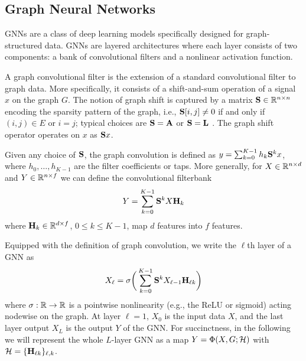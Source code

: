 \subsection{Graph Neural Networks}

GNNs are a class of deep learning models specifically designed for graph-structured data. GNNs are layered architectures where each layer consists of two components: a bank of convolutional filters and a nonlinear activation function. 

A graph convolutional filter is the extension of a standard convolutional filter to graph data. More specifically, it consists of a shift-and-sum operation of a signal $x$ on the graph $G$. The notion of graph shift is captured by a matrix ${\mathbf S} \in {\mathbb R}^{n\times n}$ encoding the sparsity pattern of the graph, i.e., ${\mathbf S}[i,j] \neq 0$ if and only if $(i,j) \in E$ or $i=j$; typical choices are ${\mathbf S}={\mathbf A}$ or ${\mathbf S}={\mathbf L}$ \cite{segarra17-linear}. The graph shift operator operates on $x$ as ${\mathbf S} x$.

Given any choice of ${\mathbf S}$, the graph convolution is defined as $y = \sum_{k=0}^{K-1} h_k {\mathbf S}^k x$, where $h_0, \ldots, h_{K-1}$ are the filter coefficients or taps. More generally, for $X \in {\mathbb R}^{n \times d}$ and $Y \in {\mathbb R}^{n\times f}$ we can define the convolutional filterbank \cite{gama18-gnnarchit}
\begin{equation}
     Y = \sum_{k=0}^{K-1} {\mathbf S}^k X {\mathbf H}_k
\end{equation}
where ${\mathbf H}_k \in {\mathbb R}^{d \times f}$, $0 \leq k \leq K-1$, map $d$ features into $f$ features.

Equipped with the definition of graph convolution, we write the $\ell$th layer of a GNN as \cite{gama18-gnnarchit}
\begin{equation}
    X_{\ell} = \sigma \bigg( \sum_{k=0}^{K-1} {\mathbf S}^k X_{\ell-1} {\mathbf H}_{\ell k}\bigg)
\end{equation}
where $\sigma: {\mathbb R} \to {\mathbb R}$ is a pointwise nonlinearity (e.g., the ReLU or sigmoid) acting nodewise on the graph. At layer $\ell=1$, $X_0$ is the input data $X$, and the last layer output $X_L$ is the output $Y$ of the GNN. For succinctness, in the following we will represent the whole $L$-layer GNN as a map $Y = \Phi(X,G;{\mathcal H})$ with ${\mathcal H}=\{{\mathbf H}_{\ell k}\}_{\ell,k}$.


